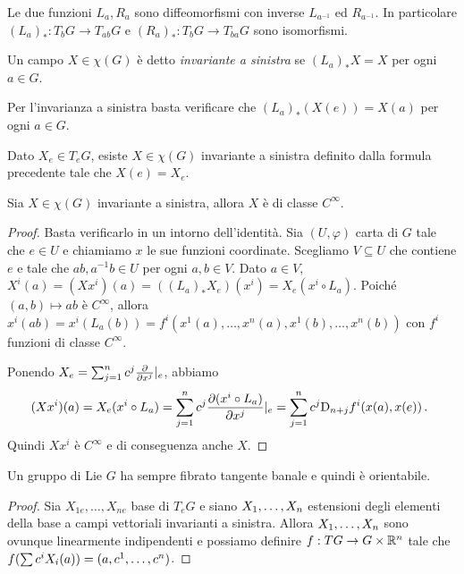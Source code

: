Le due funzioni $L_a,R_a$ sono diffeomorfismi con inverse $L_{a^{-1}}$ ed $R_{a^{-1}}$.
In particolare $(L_a)_* : T_bG \to T_{ab} G$ e $(R_a)_* : T_bG \to T_{ba} G$ sono isomorfismi.


\begin{definition}
	Un campo $X\in\chi(G)$ è detto \emph{invariante a sinistra} se $(L_a)_*X=X$ per ogni $a\in G$.
\end{definition}

\begin{remark}
	Per l'invarianza a sinistra basta verificare che $(L_a)_*(X(e)) = X(a)$ per ogni $a\in G$.
\end{remark}

Dato $X_e \in T_eG$, esiste $X\in\chi(G)$ invariante a sinistra definito dalla formula precedente tale che $X(e) = X_e$.


\begin{proposition}
	Sia $X \in \chi(G)$ invariante a sinistra, allora $X$ è di classe $C^\infty$.
\end{proposition}
\begin{proof}
	Basta verificarlo in un intorno dell'identità. Sia $(U,\varphi)$ carta di $G$ tale che $e\in U$ e chiamiamo $x$ le sue funzioni coordinate. Scegliamo $V\subseteq U$ che contiene $e$ e tale che $a b, a^{-1}b \in U$ per ogni $a,b\in V$.
	Dato $a\in V$, $X^i(a) = (Xx^i)(a) = ((L_a)_* X_e) (x^i) = X_e (x^i\circ L_a)$.
	Poiché $(a,b) \mapsto ab$ è $C^\infty$, allora $x^i(ab) = x^i( L_a(b) ) = f^i(x^1(a),\ldots, x^n(a), x^1(b), \ldots, x^n(b) )$ con $f^i$ funzioni di classe $C^\infty$.
	
	Ponendo $X_e = \sum_{j=1}^n c^j \DerParz{}{x^j}\restrict e$, abbiamo
	\begin{equation*}
	(X x^i) (a) = X_e (x^i \circ L_a) = \sum_{j=1}^n c^j \DerParz{(x^i\circ L_a)}{x^j} \restrict e = 
	\sum_{j=1}^n c^j \Diff_{n+j} f^i(x(a), x(e))\punto
	\end{equation*}
	Quindi $Xx^i$ è $C^\infty$ e di conseguenza anche $X$.
\end{proof}

\begin{corollary}
	Un gruppo di Lie $G$ ha sempre fibrato tangente banale e quindi è orientabile.
\end{corollary}
\begin{proof}
	Sia $X_{1e},\ldots,X_{ne}$ base di $T_eG$ e siano $\seqb Xn,$ estensioni degli elementi della base a campi vettoriali invarianti a sinistra. Allora $\seqb Xn,$ sono ovunque linearmente indipendenti e possiamo definire $f:TG \to G\times \R^n$ tale che $f(\sum c^iX_i(a)) = (a,\seqa cn,)$.
\end{proof}

